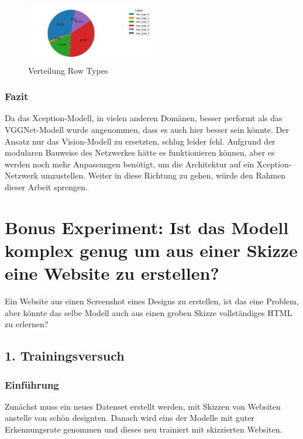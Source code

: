 \documentclass[pdftex,a4paper,halfparskip, article]{scrartcl}
\begin{document}
\begin{figure}[h]
\centering
\includegraphics[width=0.5\textwidth]{predictions_bin19_x_predicted_row_type_distribution}
\caption{Verteilung Row Types}
\label{fig:bin19_x_row_type}
\end{figure}


\subsubsection*{Fazit}

Da das Xception-Modell, in vielen anderen Domänen, besser performt als das VGGNet-Modell wurde angenommen, dass es auch hier besser sein könnte.  Der Ansatz nur das Vision-Modell zu ersetzten, schlug leider fehl. Aufgrund der modularen Bauweise des Netzwerkes hätte es funktionieren können, aber es werden noch mehr Anpassungen benötigt, um die Architektur auf ein Xception-Netzwerk umzustellen. Weiter in diese Richtung zu gehen, würde den Rahmen dieser Arbeit sprengen.

\section{Bonus Experiment: Ist das Modell komplex genug um aus einer Skizze eine Website zu erstellen?}\label{sub:skizze}

Ein Website aus einen Screenshot eines Designs zu erstellen, ist das eine Problem, aber könnte das selbe Modell auch aus einen groben Skizze vollständiges HTML zu erlernen?

\subsection{1. Trainingsversuch}

\subsubsection*{Einführung}

Zunächst muss ein neues Datenset erstellt werden, mit Skizzen von Websiten anstelle von schön designten. Danach wird eins der Modelle mit guter Erkennungsrate genommen und dieses neu trainiert mit skizzierten Websiten.
\end{document}
